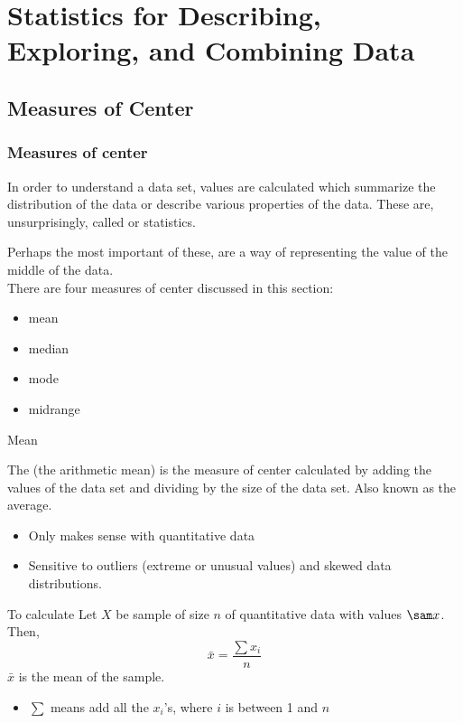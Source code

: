 \documentclass[xcolor=table, handout]{beamer}
\begin{document}
\setcounter{section}{2}
\section{Statistics for Describing, Exploring, and Combining Data}

\setcounter{subsection}{1}
\subsection{Measures of Center}

\begin{frame}
\frametitle{Measures of center}
\begin{block}{}
In order to understand a data set, values are calculated which summarize the distribution of the data or describe various properties of the data. These are, unsurprisingly, called  or  statistics.
\end{block}
\pause
\begin{block}{}
Perhaps the most important of these,  are a way of  representing the value of the middle of the data.\\
\medskip
There are four measures of center discussed in this section:
\begin{itemize}
\item mean
\item median
\item mode
\item midrange
\end{itemize} 
\end{block}
\end{frame}

\begin{frame}{Mean}
\begin{block}{}
The  (the arithmetic mean) is the measure of center calculated by adding the values of the data set and dividing by the size of the data set. Also known as the average.
\begin{itemize}
\item Only makes sense with quantitative data
\item Sensitive to outliers (extreme or unusual values) and skewed data distributions.
\end{itemize}
\end{block}

\pause
\begin{exampleblock}{To calculate}
Let $X$ be sample of size $n$ of quantitative data with values $\sam x$. Then,
\[\bar x = \frac{\sum x_i}{n}\]
$\bar x$ is the mean of the sample.
\begin{itemize}
\item $\sum$ means add all the $x_i$'s, where $i$ is between 1 and $n$
\end{itemize}
\end{exampleblock}
\end{frame}
\end{document}
